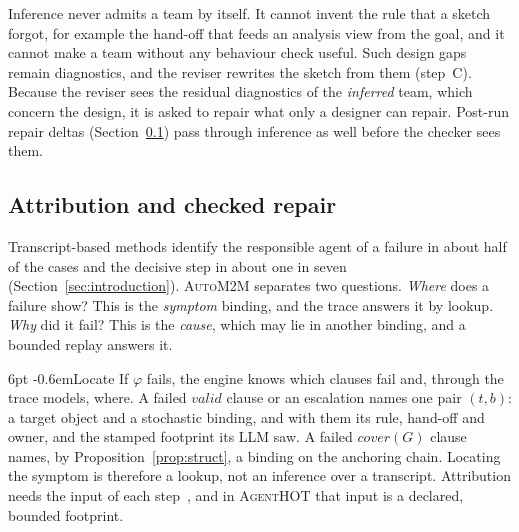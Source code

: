 \documentclass[pdflatex,sn-mathphys-num]{sn-jnl}
\makeatletter
\theoremstyle{thmstyleone}%
\theoremstyle{thmstyletwo}%
\theoremstyle{thmstylethree}%
\newcommand{\tool}{\textsc{AgentHOT}}
\newcommand{\auto}{\textsc{AutoM2M}}
\renewcommand\paragraph{\@startsection{paragraph}{4}{\z@}%
  {6pt \@plus 2pt \@minus 1pt}{-0.6em}{\normalfont\normalsize\bfseries}}
\makeatother
\begin{document}
Inference never admits a team by itself. It cannot invent the rule that a
sketch forgot, for example the hand-off that feeds an analysis view from the
goal, and it cannot make a team without any behaviour check useful. Such
design gaps remain diagnostics, and the reviser rewrites the sketch from them
(step~C). Because the reviser sees the residual diagnostics of the
\emph{inferred} team, which concern the design, it is asked to repair what only
a designer can repair. Post-run repair deltas (Section~\ref{sec:app-attr}) pass
through inference as well before the checker sees them.

\subsection{Attribution and checked repair}\label{sec:app-attr}

Transcript-based methods identify the responsible agent of a failure in about
half of the cases and the decisive step in about one in seven
(Section~\ref{sec:introduction}). \auto{} separates two questions. \emph{Where}
does a failure show? This is the \emph{symptom} binding, and the trace answers
it by lookup. \emph{Why} did it fail? This is the \emph{cause}, which may lie
in another binding, and a bounded replay answers it.

\paragraph{Locate} If $\varphi$ fails, the engine knows which clauses fail
and, through the trace models, where. A failed $\mathit{valid}$ clause or an
escalation names one pair $(t,b)$: a target object and a stochastic binding,
and with them its rule, hand-off and owner, and the stamped footprint its LLM
saw. A failed $\mathit{cover}(G)$ clause names, by
Proposition~\ref{prop:struct}, a binding on the anchoring chain. Locating the
symptom is therefore a lookup, not an inference over a transcript. Attribution
needs the input of each step~\cite{chen2026traceelephant}, and in \tool{} that
input is a declared, bounded footprint.
\end{document}
